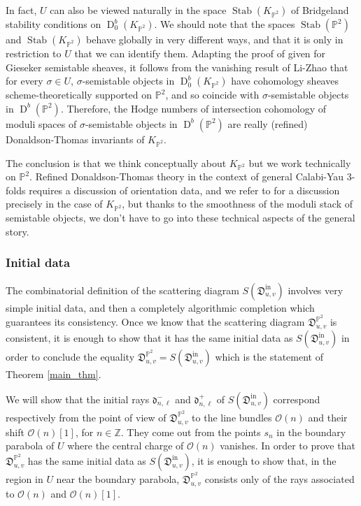 \documentclass[12pt, a4paper]{amsart}
\newcommand\PP{\mathbb P}
\newcommand\Z{\mathbb Z}
\newcommand\cO{\mathcal O}
\newcommand\fd{\mathfrak d}
\newcommand\fD{\mathfrak D}
\newcommand\Stab{\operatorname{Stab}}
\newcommand\D{\operatorname{D}}
\newcommand\iin{\mathrm{in}}
\begin{document}
In fact, $U$
can also be viewed  naturally in the space $\Stab(K_{\PP^2})$ of Bridgeland stability conditions on $\D^b_0(K_{\PP^2})$. We should note that the spaces $\Stab(\PP^2)$ and 
$\Stab(K_{\PP^2})$ behave globally in very different ways, and that it is only 
in restriction to $U$ that we can identify them.
Adapting the proof of 
\cite[Proposition 3.1]{MR3861701} given for Gieseker semistable sheaves, it
follows from the vanishing result of Li-Zhao \cite{MR3936077} that for every $\sigma \in U$,
$\sigma$-semistable objects in $\D^b_0(K_{\PP^2})$ have cohomology sheaves scheme-theoretically supported on $\PP^2$, and so coincide with 
$\sigma$-semistable objects in 
$\D^b(\PP^2)$. 
Therefore, the Hodge numbers of
intersection cohomology of moduli spaces of 
$\sigma$-semistable objects in 
$\D^b(\PP^2)$ are really 
(refined) Donaldson-Thomas invariants of 
$K_{\PP^2}$.

The conclusion is that we think conceptually about $K_{\PP^2}$ but we work technically on $\PP^2$. 
Refined Donaldson-Thomas theory in the context of general 
Calabi-Yau 3-folds requires a discussion of orientation data, and we refer to \cite{shi2018orientation} for
a discussion precisely in the case of $K_{\PP^2}$, 
but thanks to the smoothness of the moduli stack of semistable objects, 
we don't have to go into these technical aspects of the general story.

\subsubsection{Initial data}
The combinatorial definition of the scattering diagram $S(\fD^{\iin}_{u,v})$
involves very simple initial data, and then a 
completely algorithmic completion which guarantees its consistency. 
Once we know that the scattering diagram 
$\fD^{\PP^2}_{u,v}$ is consistent, it is enough to show that it has the same initial data as $S(\fD^{\iin}_{u,v})$ in order to conclude the equality
$\fD^{\PP^2}_{u,v}=S(\fD^{\iin}_{u,v})$ which is the statement of Theorem \ref{main_thm}.

We will show that the initial rays
$\fd_{n,\ell}^-$ and $\fd_{n,\ell}^+$ of $S(\fD^{\iin}_{u,v})$ correspond respectively from the point of view of 
$\fD^{\PP^2}_{u,v}$ to the line bundles $\cO(n)$ and their shift
$\cO(n)[1]$, for $n \in \Z$. They come out from 
the points $s_n$ in the boundary parabola of $U$ where the central charge of $\cO(n)$ vanishes.
In order to prove that 
$\fD^{\PP^2}_{u,v}$ has the same initial data as
$S(\fD^{\iin}_{u,v})$, it is enough to show that, in the region in $U$ near the boundary parabola, 
$\fD^{\PP^2}_{u,v}$ consists only of the rays associated to $\cO(n)$ and 
$\cO(n)[1]$. 
\end{document}

